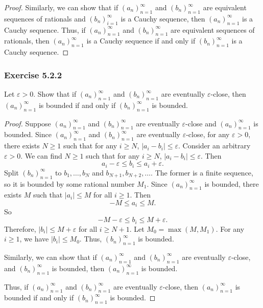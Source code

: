 \documentclass[12pt, letter]{article}
\newcommand{\an}{$(a_n)_{n=1}^\infty$ }
\newcommand{\bn}{$(b_n)_{n=1}^\infty$ }
\begin{document}
\begin{proof}
    Similarly, we can show that if $(a_n)_{n=1}^\infty$ and $(b_n)_{n=1}^\infty$ are equivalent sequences of rationals and $(b_n)_{i=1}^\infty$ is 
    a Cauchy sequence, then $(a_n)_{n=1}^\infty$ is a Cauchy sequence. Thus, if $(a_n)_{n=1}^\infty$ and $(b_n)_{n=1}^\infty$ are equivalent sequences of rationals, then $(a_n)_{n=1}^\infty$ is a Cauchy sequence if and only if $(b_n)_{n=1}^\infty$
    is a Cauchy sequence.
\end{proof}
\subsubsection*{Exercise 5.2.2}
Let $\varepsilon>0$. Show that if $(a_n)_{n=1}^\infty$ and $(b_n)_{n=1}^\infty$ are eventually $\varepsilon$-close, then \an is bounded if and only if \bn is bounded.
\begin{proof}
    Suppose $(a_n)_{n=1}^\infty$ and $(b_n)_{n=1}^\infty$ are eventually $\varepsilon$-close and \an is bounded. Since $(a_n)_{n=1}^\infty$ and $(b_n)_{n=1}^\infty$ are eventually $\varepsilon$-close,
    for any $\varepsilon>0$, there exists $N\geq 1$ such that for any $i\geq N$, $|a_i-b_i|\leq\varepsilon$. Consider an arbitrary $\varepsilon>0$. We can find $N\geq 1$ such that for any 
    $i\geq N$, $|a_i-b_i|\leq \varepsilon$. Then 
    \begin{equation*}
        a_i-\varepsilon\leq b_i\leq a_i+\varepsilon.
    \end{equation*}
    Split \bn to $b_1,\dotsc,b_{N}$ and $b_{N+1},b_{N+2},\dotsc$. The former is a finite sequence, so it is bounded by some rational number $M_1$. Since \an is bounded, there exists $M$ such that $|a_i|\leq M$ for all $i\geq 1$. Then 
    \begin{equation*}
        -M\leq a_i\leq M.
    \end{equation*}
    So
    \begin{equation*}
        -M-\varepsilon\leq b_i\leq M+\varepsilon.
    \end{equation*}
    Therefore, $|b_i|\leq M+\varepsilon$ for all $i\geq N+1$. Let $M_0=\max(M,M_1)$. For any $i\geq 1$, we have $|b_i|\leq M_0$. Thus, \bn is bounded. 

    Similarly, we can show that if $(a_n)_{n=1}^\infty$ and $(b_n)_{n=1}^\infty$ are eventually $\varepsilon$-close, and \bn is bounded, then \an is bounded.

    Thus, if $(a_n)_{n=1}^\infty$ and $(b_n)_{n=1}^\infty$ are eventually $\varepsilon$-close, then \an is bounded if and only if \bn is bounded. 
\end{proof}
\end{document}
